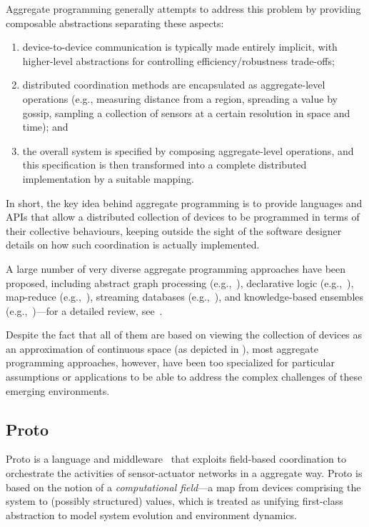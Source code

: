 \documentclass[12pt,a4paper,twoside,openright]{book}
\begin{document}
Aggregate programming generally attempts to address this problem by providing composable abstractions separating these aspects:
\begin{enumerate}
 \item device-to-device communication is typically made entirely implicit, with higher-level abstractions for controlling efficiency/robustness trade-offs;
 \item distributed coordination methods are encapsulated as aggregate-level operations (e.g., measuring distance from a region, spreading a value by gossip, sampling a collection of sensors at a certain resolution in space and time); and
 \item the overall system is specified by composing aggregate-level operations, and this specification is then transformed into a complete distributed implementation by a suitable mapping.
\end{enumerate}

In short, the key idea behind aggregate programming is to provide languages and APIs that allow a distributed collection of devices to be programmed in terms of their collective behaviours, keeping outside the sight of the software designer details on how such coordination is actually implemented.

A large number of very diverse aggregate programming approaches have been proposed, including abstract graph processing (e.g.,~\cite{kairos}), declarative logic (e.g.,~\cite{Meld}), map-reduce (e.g.,~\cite{dean2008mapreduce}), streaming databases (e.g.,~\cite{tinydb}), and knowledge-based ensembles (e.g.,~\cite{SCEL})---for a detailed review, see~\cite{SpatialIGI2013}.

Despite the fact that all of them are based on viewing the collection of devices as an approximation of continuous space (as depicted in ), most aggregate programming approaches, however, have been too specialized for particular assumptions or applications to be able to address the complex challenges of these emerging environments.

\subsection{Proto}
\label{proto}

Proto is a language and middleware~\cite{proto} that exploits field-based coordination to orchestrate the activities of sensor-actuator networks in a aggregate way.
%
Proto is based on the notion of a {\em computational field}---a map from devices comprising the system to (possibly structured) values, which is treated as unifying first-class abstraction to model system evolution and environment dynamics.
\end{document}
